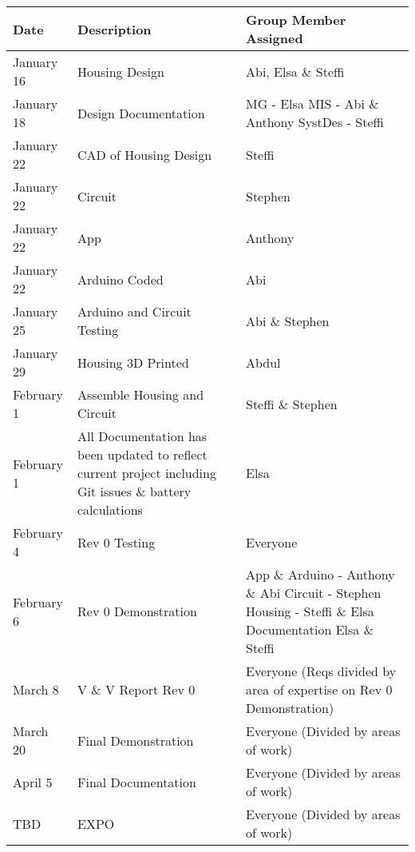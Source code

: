 \documentclass[12pt, titlepage]{article}
\begin{document}
\begin{minipage}{\textwidth}
\renewcommand*{\arraystretch}{1.5}
\begin{tabular}{| p{} | p{} | p{} |}
 \hline
 Date & Description & Group Member Assigned\\ 
 \hline
 January 16 & Housing Design & Abi, Elsa \& Steffi\\ 
 \hline
 January 18 & Design Documentation & MG - Elsa \newline MIS - Abi \& Anthony \newline SystDes - Steffi\\ 
  \hline
  January 22 & CAD of Housing Design & Steffi\\ 
  \hline
    January 22 & Circuit & Stephen\\ 
  \hline
    January 22 & App & Anthony\\ 
    \hline
    January 22 & Arduino Coded & Abi\\ 
  \hline
   January 25 & Arduino and Circuit Testing & Abi \& Stephen\\ 
  \hline
   January 29 & Housing 3D Printed & Abdul\\ 
  \hline
    February 1& Assemble Housing and Circuit & Steffi \& Stephen\\ 
  \hline
   February 1& All Documentation has been updated to reflect current project including Git issues \& battery calculations& Elsa\\ 
  \hline
      February 4 & Rev 0 Testing & Everyone\\ 
  \hline
  February 6 & Rev 0 Demonstration & App \& Arduino - Anthony \& Abi \newline Circuit - Stephen \newline Housing - Steffi \& Elsa \newline Documentation Elsa \& Steffi\\
  \hline
  March 8 & V \& V Report Rev 0 & Everyone \newline(Reqs divided by area of expertise on Rev 0 Demonstration)\\
  \hline
 March 20 & Final Demonstration & Everyone \newline(Divided by areas of work)\\
 \hline
 April 5 & Final Documentation & Everyone \newline(Divided by areas of work)\\
 \hline
 TBD & EXPO & Everyone (Divided by areas of work)\\
 \hline
\end{tabular}
\end{minipage}\\
\end{document}
